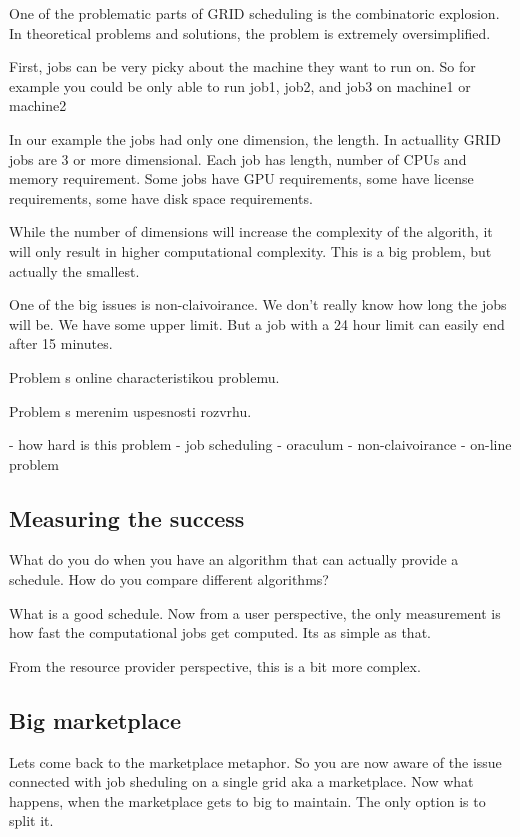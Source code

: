 \documentclass[10pt]{article}
\begin{document}
One of the problematic parts of GRID scheduling is the combinatoric explosion.
In theoretical problems and solutions, the problem is extremely oversimplified.

First, jobs can be very picky about the machine they want to run on.
So for example you could be only able to run job1, job2, and job3 on machine1 or machine2

In our example the jobs had only one dimension, the length.  In actuallity GRID
jobs are 3 or more dimensional. Each job has length, number of CPUs and memory
requirement. Some jobs have GPU requirements, some have license requirements,
some have disk space requirements.

While the number of dimensions will increase the complexity of the algorith, it
will only result in higher computational complexity. This is a big problem, but
actually the smallest.

One of the big issues is non-claivoirance. We don't really know how long the
jobs will be.  We have some upper limit. But a job with a 24 hour limit can
easily end after 15 minutes.

Problem s online characteristikou problemu.

Problem s merenim uspesnosti rozvrhu.

- how hard is this problem
  - job scheduling
  - oraculum
  - non-claivoirance
  - on-line problem

\subsection{Measuring the success}

What do you do when you have an algorithm that can actually provide a schedule.
How do you compare different algorithms?

What is a good schedule. Now from a user perspective, the only measurement is
how fast the computational jobs get computed. Its as simple as that.

From the resource provider perspective, this is a bit more complex. 

\subsection{Big marketplace}

Lets come back to the marketplace metaphor. So you are now aware of the issue
connected with job sheduling on a single grid aka a marketplace.  Now what
happens, when the marketplace gets to big to maintain. The only option is to split it.
\end{document}
